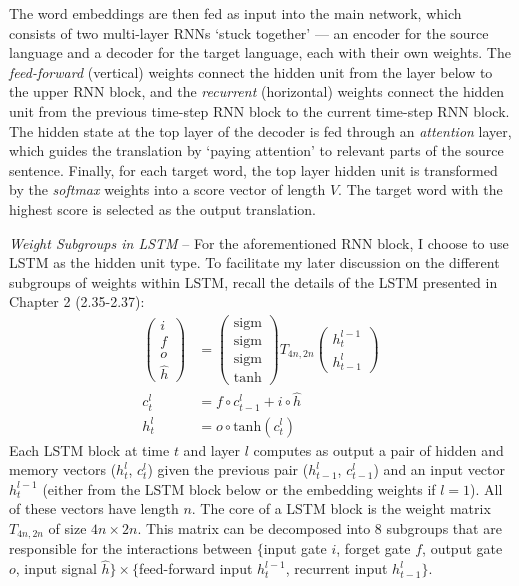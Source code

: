 The word embeddings are then fed as input into the main network, which consists
of two multi-layer RNNs `stuck together' --- an encoder for the source
language and a decoder for the target language, each with their own
weights. 
The \emph{feed-forward} (vertical) weights connect
the hidden unit from the layer below to the upper RNN block, and the
\emph{recurrent} (horizontal) weights connect the hidden unit from the previous
time-step RNN block to the current time-step RNN block.
The hidden state at the top layer of the decoder is fed through an
\textit{attention} layer, which guides the translation by `paying attention'
to relevant parts of the source sentence.
Finally, for each target word, the top layer hidden unit is transformed by the
\emph{softmax} weights into a score vector of length $V$. The target word with the highest score is selected as the output translation.

{\it Weight Subgroups in LSTM} -- For the aforementioned RNN block, I choose to
use LSTM as the hidden unit type. To facilitate my later discussion 
on the different subgroups of weights
within LSTM, recall the details of the LSTM presented in Chapter 2 (2.35-2.37):
\begin{align}
\begin{pmatrix}
i\\
f\\
o\\
\hat{h}
\end{pmatrix}
&=
\begin{pmatrix}
\text{sigm}\\
\text{sigm}\\
\text{sigm}\\
\text{tanh}
\end{pmatrix}
T_{4n,2n}
\begin{pmatrix}
h_t^{l-1}\\
h_{t-1}^l
\end{pmatrix} \label{eqn:lstm_1} \\
c_t^l&=f \circ c_{t-1}^l + i \circ \hat{h} \label{eqn:lstm_2} \\
h_t^l &= o \circ \text{tanh}(c_t^l) \label{eqn:lstm_3}
\end{align}
Each LSTM block at time $t$ and layer $l$ computes as output a pair of
hidden and memory vectors ($h_t^l$, $c_t^l$) given the previous pair
($h_{t-1}^l$, $c_{t-1}^l$) and an input vector $h_t^{l-1}$ (either from the LSTM block below or
the embedding weights if $l\!=\!1$). All of these vectors
have length $n$.
The core of a LSTM block is the weight matrix $T_{4n,2n}$ of size $4n \times
2n$. This matrix can be decomposed into 8 subgroups that are responsible for the
interactions between $\{$input gate $i$, forget gate $f$, output gate $o$,
input signal $\hat{h}\} \times \{$feed-forward input $h_t^{l-1}$, recurrent
input $h_{t-1}^l\}$.

